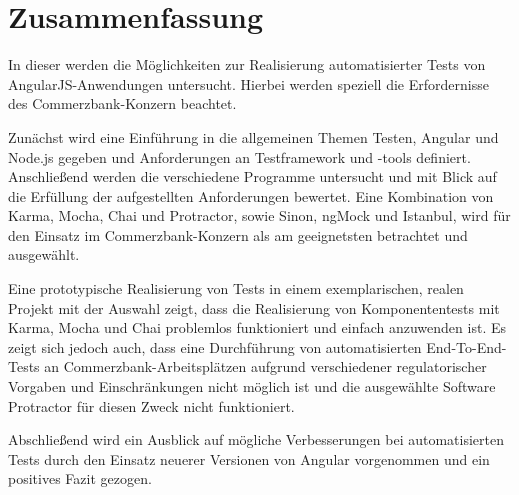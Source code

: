 \section*{Zusammenfassung}
In dieser \titleDocument{} werden die Möglichkeiten zur Realisierung automatisierter Tests von AngularJS-Anwendungen untersucht. Hierbei werden speziell die Erfordernisse des Commerzbank-Konzern beachtet.

Zunächst wird eine Einführung in die allgemeinen Themen Testen, Angular und Node.js gegeben und Anforderungen an Testframework und -tools definiert. Anschließend werden die verschiedene Programme untersucht und mit Blick auf die Erfüllung der aufgestellten Anforderungen bewertet. Eine Kombination von Karma, Mocha, Chai und Protractor, sowie Sinon, ngMock und Istanbul, wird für den Einsatz im Commerzbank-Konzern als am geeignetsten betrachtet und ausgewählt.

Eine prototypische Realisierung von Tests in einem exemplarischen, realen Projekt mit der Auswahl zeigt, dass die Realisierung von Komponententests mit Karma, Mocha und Chai problemlos funktioniert und einfach anzuwenden ist. Es zeigt sich jedoch auch, dass eine Durchführung von automatisierten End-To-End-Tests an Commerzbank-Arbeitsplätzen aufgrund verschiedener regulatorischer Vorgaben und Einschränkungen nicht möglich ist und die ausgewählte Software Protractor für diesen Zweck nicht funktioniert.

Abschließend wird ein Ausblick auf mögliche Verbesserungen bei automatisierten Tests durch den Einsatz neuerer Versionen von Angular vorgenommen und ein positives Fazit gezogen.